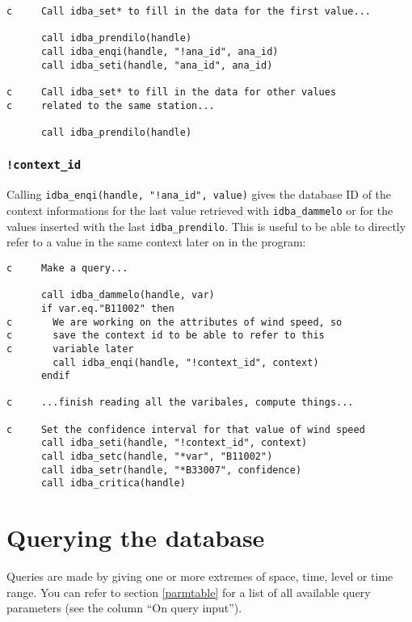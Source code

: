 \documentclass[draft,12pt,a4paper,twoside]{book}
\begin{document}
\begin{verbatim}
c     Call idba_set* to fill in the data for the first value...

      call idba_prendilo(handle)
      call idba_enqi(handle, "!ana_id", ana_id)
      call idba_seti(handle, "ana_id", ana_id)

c     Call idba_set* to fill in the data for other values
c     related to the same station...

      call idba_prendilo(handle)
\end{verbatim}

\subsubsection{{\tt !context\_id}}

Calling {\tt idba\_enqi(handle, "!ana\_id", value)} gives the database ID of
the context informations for the last value retrieved with {\tt idba\_dammelo}
or for the values inserted with the last {\tt idba\_prendilo}.  This is useful
to be able to directly refer to a value in the same context later on in the
program:


\begin{verbatim}
c     Make a query...

      call idba_dammelo(handle, var)
      if var.eq."B11002" then
c       We are working on the attributes of wind speed, so
c       save the context id to be able to refer to this
c       variable later
        call idba_enqi(handle, "!context_id", context)
      endif

c     ...finish reading all the varibales, compute things...

c     Set the confidence interval for that value of wind speed
      call idba_seti(handle, "!context_id", context)
      call idba_setc(handle, "*var", "B11002")
      call idba_setr(handle, "*B33007", confidence)
      call idba_critica(handle)
\end{verbatim}

\section {Querying the database}

Queries are made by giving one or more extremes of space, time, level or time
range.  You can refer to section \ref{parmtable} for a list of all available
query parameters (see the column ``On query input'').
\end{document}
